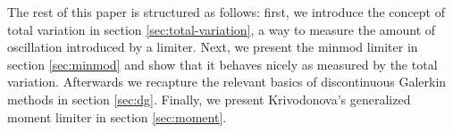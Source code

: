 The rest of this paper is structured as follows: first, we introduce the concept of total variation in section \ref{sec:total-variation}, a way to measure the amount of oscillation introduced by a limiter.
Next, we present the minmod limiter in section \ref{sec:minmod} and show that it behaves nicely as measured by the total variation.
Afterwards we recapture the relevant basics of discontinuous Galerkin methods in section \ref{sec:dg}.
Finally, we present Krivodonova's generalized moment limiter in section \ref{sec:moment}.

